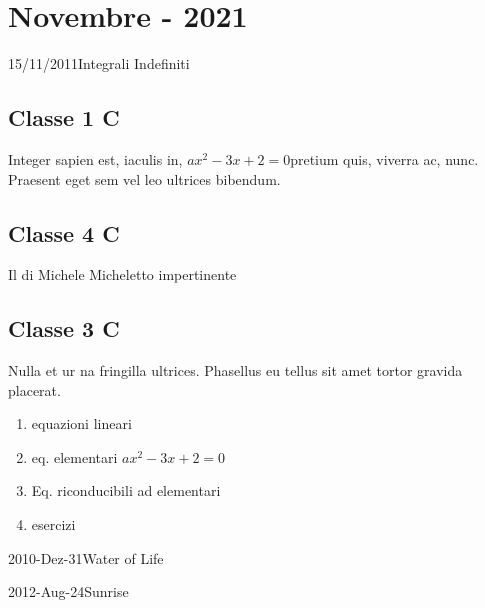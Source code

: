 \documentclass[10pt, twoside, notitlepage, notoc, justified]{tufte-handout}
\begin{document}
\section{Novembre - 2021}

 \begin{loggentry}{15/11/2011}{Integrali Indefiniti}
 	\subsection{Classe 1 C}
 	 Integer sapien est, iaculis in, \(a x^2 - 3 x + 2 = 0\)pretium quis, viverra ac, nunc. Praesent eget sem vel leo ultrices bibendum.
 	 \subsection{Classe 4 C}
 	  Il di Michele Micheletto impertinente
 	 \subsection{Classe 3 C}
 	 Nulla et ur na fringilla ultrices. Phasellus eu tellus sit amet tortor gravida placerat.
 	 \begin{enumerate}
 	 	\item equazioni lineari
 	 	\item eq. elementari \(a x^2 - 3 x + 2 = 0\)
 	 	\item Eq. riconducibili ad elementari
 	 	\item esercizi
 	 \end{enumerate}
 \end{loggentry}
  
\begin{loggentry}{2010-Dez-31}{Water of Life}
\lipsum[9] 
\end{loggentry}

 \begin{loggentry}{2012-Aug-24}{Sunrise}
\lipsum[6]
\end{loggentry}
\end{document}
